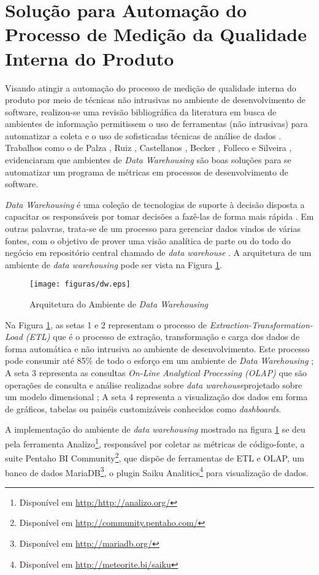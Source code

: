 \section{Solução para Automação do Processo de Medição da Qualidade Interna do Produto}
\label{sec:solucao}

Visando atingir a automação do processo de medição de qualidade interna do produto por meio de técnicas não intrusivas no ambiente de desenvolvimento de software, realizou-se uma revisão bibliográfica da literatura em busca de ambientes de informação permitissem o uso de ferramentas (não intrusivas) para automatizar a coleta e o uso de sofisticadas técnicas de análise de dados \cite{Gopal2005} . Trabalhos como o de Palza \cite{Palza2003},  Ruiz \cite{Ruiz2005}, Castellanos \cite{Castellanos2005},  Becker \cite{Becker2006}, Folleco \cite{Folleco2007} e Silveira \cite{Silveira2010}, evidenciaram que ambientes de \textit{Data Warehousing} são boas soluções para se automatizar um programa de métricas em processos de desenvolvimento de software.

\textit{Data Warehousing} é uma coleção de tecnologias de suporte à decisão disposta a capacitar os responsáveis por tomar decisões a fazê-las de forma mais rápida \cite{chaudhuri1997} \cite{andre2000}. Em outras palavras, trata-se de um processo para gerenciar dados vindos de várias fontes, com o objetivo de prover uma visão analítica de parte ou do todo do negócio em repositório central chamado de \textit{data warehouse} \cite{gardner1998} \cite{Kimball2002}. A arquitetura de um ambiente de \textit{data warehousing} pode ser vista na Figura \ref{arquitetura}. 

\begin{figure}[ht!]
\centering
\texttt{[image: figuras/dw.eps]}
\caption{Arquitetura do Ambiente de \textit{Data Warehousing}}
\label{arquitetura}
\end{figure}
\FloatBarrier


Na Figura \ref{arquitetura}, as setas 1 e 2 representam o processo de \textit{Extraction-Transformation-Load (ETL)} que é o processo de extração, transformação e carga dos dados de forma automática e não intrusiva ao ambiente de desenvolvimento. Este processo pode consumir até 85\% de todo o esforço em um ambiente de \textit{Data Warehousing} \cite{Kimball2002}; A seta 3 representa as consultas \textit{On-Line Analytical Processing (OLAP)} que são operações de consulta e análise realizadas sobre \textit{data warehouse}projetado sobre um modelo dimensional \cite{Kimball2002} \cite{Codd1993}; A seta 4 representa a visualização dos dados em forma de gráficos, tabelas ou painéis customizáveis conhecidos como \textit{dashboards}.


A implementação do ambiente de \textit{data warehousing} mostrado na figura \ref{arquitetura} se deu pela ferramenta Analizo\footnote{Disponível em \url{http:/http://analizo.org/}}, responsável por coletar as métricas de código-fonte, a suite Pentaho BI Community\footnote{Disponível em \url{http://community.pentaho.com/}}, que dispõe de ferramentas de ETL e OLAP, um banco de dados MariaDB\footnote{Disponível em \url{http://mariadb.org/}}, o plugin Saiku Analitics\footnote{Disponível em \url{http://meteorite.bi/saiku}} para visualização de dados.  